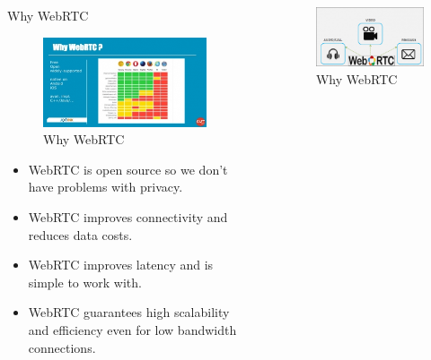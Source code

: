 \documentclass[final]{beamer}
\newlength{\sepwid}
\newlength{\onecolwid}
\newlength{\twocolwid}
\begin{document}
\begin{frame}[t]
\begin{columns}[t]
\begin{column}{\twocolwid}
\begin{columns}[t,totalwidth=\twocolwid]
\begin{column}{\onecolwid}
\begin{block}{Why WebRTC}
\begin{figure}
\includegraphics[width=0.8\linewidth]{why.jpg}
\caption{Why WebRTC}
\end{figure}


\begin{itemize}
\item WebRTC is open source so we don't have problems with privacy.
\item WebRTC improves connectivity and reduces data costs.
\item WebRTC improves latency and is simple to work with.
\item WebRTC guarantees high scalability and efficiency even for low bandwidth connections.
\end{itemize}



\end{block}


\end{column} %

\end{columns} %

\end{column} %

\begin{column}{\sepwid}\end{column} %

\begin{column}{\onecolwid} %

\begin{figure}
\includegraphics[width=0.8\linewidth]{whatt.png}
\caption{Why WebRTC}
\end{figure}



\end{column}
\end{columns}
\end{frame}
\end{document}
